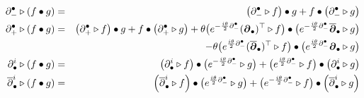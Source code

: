 \begin{eqnarray}
  \label{STOLeibniz}
  \partial_-^\bullet\triangleright(f\bullet g)&=&
  \left(\partial_-^\bullet\triangleright f\right)\bullet g+
f\bullet\left(\partial_-^\bullet\triangleright g\right)
\\\nonumber \partial_+^\bullet\triangleright(f\bullet g)&=&
\left(\partial_+^\bullet\triangleright f\right)\bullet g+
f\bullet\left(\partial_+^\bullet\triangleright g\right)
+\theta \bigl( e^{-\frac{ i\theta}2 \partial_-^\bullet} 
({{\boldsymbol {\partial} }}_\bullet)^\top\triangleright f\bigr) \bullet \bigl(
 e^{-\frac{ i\theta}2 \partial_-^\bullet} 
\overline{{{\boldsymbol {\partial} }}}_\bullet\triangleright g\bigr) \\\nonumber &&
\qquad\qquad\qquad\qquad\qquad\qquad - 
\theta \bigl( e^{\frac{ i\theta}2 \partial_-^\bullet} 
( \overline{{{\boldsymbol {\partial} }}}_\bullet)^\top\triangleright f\bigr) \bullet 
\bigl( e^{\frac{ i\theta}2 \partial_-^\bullet} {{\boldsymbol {\partial} }}_\bullet
\triangleright g\bigr) \\\nonumber
\partial^i_\bullet\triangleright(f\bullet g)&=&\left(\partial^i_\bullet
\triangleright f\right)\bullet\bigl( e^{-\frac{ i\theta}2 
\partial_-^\bullet}\triangleright g\bigr)+\bigl(
 e^{\frac{ i\theta}2 \partial_-^\bullet}\triangleright f
\bigr)\bullet\left(\partial^i_\bullet\triangleright g\right)
\\\nonumber \overline{\partial}^{ i}_\bullet\triangleright(f\bullet g)
&=&\left( \overline{\partial}^{ i}_\bullet
\triangleright f\right)\bullet\bigl( e^{\frac{ i\theta}2 
\partial_-^\bullet}\triangleright g\bigr)+\bigl(
 e^{-\frac{ i\theta}2 \partial_-^\bullet}\triangleright f
\bigr)\bullet\left( \overline{\partial}^{ i}_\bullet\triangleright g\right)
\end{eqnarray}

